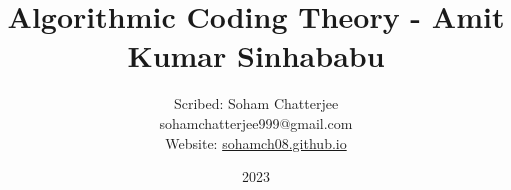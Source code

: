 \documentclass{book}
\title{\huge Algorithmic Coding Theory - Amit Kumar Sinhababu}
\author{ \vspace*{5mm} \LARGE Scribed: Soham Chatterjee\\\large sohamchatterjee999@gmail.com\\ \large Website: \href{https://sohamch08.github.io/}{sohamch08.github.io}}
\date{\LARGE 2023}
\begin{document}
\begin{titlingpage}
	\maketitle
\end{titlingpage}
	
\pagebreak
\tableofcontents 
\pagebreak












\pagebreak


\end{document}
